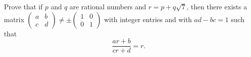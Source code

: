 \documentclass{article}
\begin{document}
\setlength{\parindent}{0pt}
Prove that if $p$ and $q$ are rational numbers and $r=p+q\sqrt{7}$, then there exists a matrix $\begin{pmatrix}a&b\\c&d\end{pmatrix}\ne\pm\begin{pmatrix}1&0\\0&1\end{pmatrix}$ with integer entries and with $ad-bc=1$ such that$$\frac{ar+b}{cr+d}=r.$$
\end{document}

